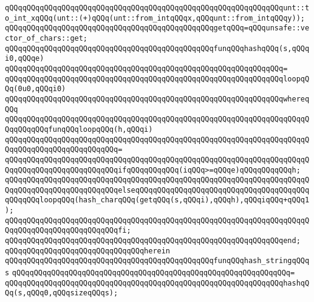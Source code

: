 \verb|qQQqqQQqqQQqqQQqqQQqqQQqqQQqqQQqqQQqqQQqqQQqqQQqqQQqqQQqqQQqqQQqunt::to_int_xqQQq(unt::(+)qQQq(unt::from_intqQQqx,qQQqunt::from_intqQQqy));|\newline
\newline
\verb|qQQqqQQqqQQqqQQqqQQqqQQqqQQqqQQqqQQqqQQqqQQqqQQqgetqQQq=qQQqunsafe::vector_of_chars::get;|\newline
\newline
\verb|qQQqqQQqqQQqqQQqqQQqqQQqqQQqqQQqqQQqqQQqqQQqqQQqfunqQQqhashqQQq(s,qQQqi0,qQQqe)|\newline
\verb|qQQqqQQqqQQqqQQqqQQqqQQqqQQqqQQqqQQqqQQqqQQqqQQqqQQqqQQqqQQqqQQq=|\newline
\verb|qQQqqQQqqQQqqQQqqQQqqQQqqQQqqQQqqQQqqQQqqQQqqQQqqQQqqQQqqQQqqQQqloopqQQq(0u0,qQQqi0)|\newline
\verb|qQQqqQQqqQQqqQQqqQQqqQQqqQQqqQQqqQQqqQQqqQQqqQQqqQQqqQQqqQQqqQQqwhereqQQq|\newline
\verb|qQQqqQQqqQQqqQQqqQQqqQQqqQQqqQQqqQQqqQQqqQQqqQQqqQQqqQQqqQQqqQQqqQQqqQQqqQQqqQQqfunqQQqloopqQQq(h,qQQqi)|\newline
\verb|qQQqqQQqqQQqqQQqqQQqqQQqqQQqqQQqqQQqqQQqqQQqqQQqqQQqqQQqqQQqqQQqqQQqqQQqqQQqqQQqqQQqqQQqqQQqqQQq=|\newline
\verb|qQQqqQQqqQQqqQQqqQQqqQQqqQQqqQQqqQQqqQQqqQQqqQQqqQQqqQQqqQQqqQQqqQQqqQQqqQQqqQQqqQQqqQQqqQQqqQQqifqQQqqQQqqQQq(iqQQq>=qQQqe)qQQqqQQqqQQqh;|\newline
\verb|qQQqqQQqqQQqqQQqqQQqqQQqqQQqqQQqqQQqqQQqqQQqqQQqqQQqqQQqqQQqqQQqqQQqqQQqqQQqqQQqqQQqqQQqqQQqqQQqelseqQQqqQQqqQQqqQQqqQQqqQQqqQQqqQQqqQQqqQQqqQQqqQQqloopqQQq(hash_charqQQq(getqQQq(s,qQQqi),qQQqh),qQQqiqQQq+qQQq1);|\newline
\verb|qQQqqQQqqQQqqQQqqQQqqQQqqQQqqQQqqQQqqQQqqQQqqQQqqQQqqQQqqQQqqQQqqQQqqQQqqQQqqQQqqQQqqQQqqQQqqQQqfi;|\newline
\newline
\verb|qQQqqQQqqQQqqQQqqQQqqQQqqQQqqQQqqQQqqQQqqQQqqQQqqQQqqQQqqQQqqQQqend;|\newline
\verb|qQQqqQQqqQQqqQQqqQQqqQQqqQQqqQQqherein|\newline
\verb|qQQqqQQqqQQqqQQqqQQqqQQqqQQqqQQqqQQqqQQqqQQqqQQqfunqQQqhash_stringqQQqs|\newline
\verb|qQQqqQQqqQQqqQQqqQQqqQQqqQQqqQQqqQQqqQQqqQQqqQQqqQQqqQQqqQQqqQQq=|\newline
\verb|qQQqqQQqqQQqqQQqqQQqqQQqqQQqqQQqqQQqqQQqqQQqqQQqqQQqqQQqqQQqqQQqhashqQQq(s,qQQq0,qQQqsizeqQQqs);|\newline
\newline
